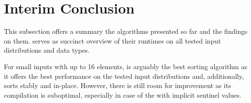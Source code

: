 \section{Interim Conclusion}
\label{sec:tasklet:conclusion}


This subsection offers a summary the algorithms presented so far and the findings on them.
 serves as succinct overview of their runtimes on all tested input distributions and data types.

For small inputs with up to 16 elements, \IS{} is arguably the best sorting algorithm as it offers the best performance on the tested input distributions and, additionally, sorts stably and in-place.
However, there is still room for improvement as its compilation is suboptimal, especially in case of the \IS{} with implicit sentinel values.

